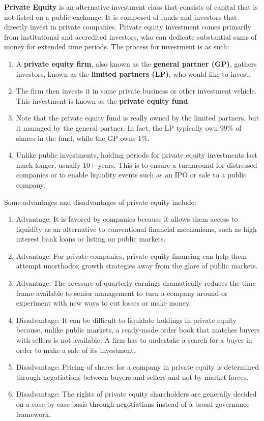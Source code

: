 \documentclass{article}
\begin{document}
  \begin{definition}
  \textbf{Private Equity} is an alternative investment class that consists of capital that is not listed on a public exchange. It is composed of funds and investors that directly invest in private companies. Private equity investment comes primarily from institutional and accredited investors, who can dedicate substantial sums of money for extended time periods. The process for investment is as such: 
  \begin{enumerate}
    \item A \textbf{private equity firm}, also known as the \textbf{general partner (GP)}, gathers investors, known as the \textbf{limited partners (LP)}, who would like to invest. 
    \item The firm then invests it in some private business or other investment vehicle. This investment is known as the \textbf{private equity fund}. 
    \item Note that the private equity fund is really owned by the limited partners, but it managed by the general partner. In fact, the LP typically own 99\% of shares in the fund, while the GP owns 1\%. 
    \item Unlike public investments, holding periods for private equity investments last much longer, usually 10+ years. This is to ensure a turnaround for distressed companies or to enable liquidity events such as an IPO or sale to a public company.  
  \end{enumerate}
  Some advantages and disadvantages of private equity include: 
  \begin{enumerate}
    \item Advantage: It is favored by companies because it allows them access to liquidity as an alternative to conventional financial mechanisms, such as high interest bank loans or listing on public markets. 
    \item Advantage: For private companies, private equity financing can help them attempt unorthodox growth strategies away from the glare of public markets. 
    \item Advantage: The pressure of quarterly earnings dramatically reduces the time frame available to senior management to turn a company around or experiment with new ways to cut losses or make money. 
    \item Disadvantage: It can be difficult to liquidate holdings in private equity because, unlike public markets, a ready-made order book that matches buyers with sellers is not available. A firm has to undertake a search for a buyer in order to make a sale of its investment. 
    \item Disadvantage: Pricing of shares for a company in private equity is determined through negotiations between buyers and sellers and not by market forces. 
    \item Disadvantage: The rights of private equity shareholders are generally decided on a case-by-case basis through negotiations instead of a broad governance framework. 
  \end{enumerate}
  \end{definition}
\end{document}
